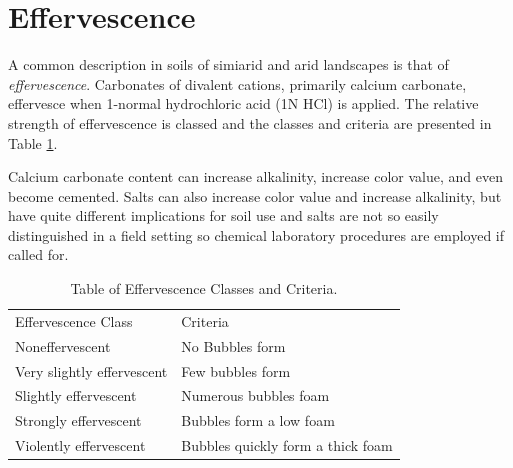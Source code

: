 \documentclass[letterpaper, 12pt]{article}
\begin{document}

 
 \section{Effervescence}
 \label{effervescence}
 

A common description in soils of simiarid and arid landscapes is that of \textit{effervescence}. Carbonates of divalent cations, primarily calcium carbonate, effervesce when 1-normal hydrochloric acid (1N HCl) is applied. The relative strength of effervescence is classed and the classes and criteria are presented in Table \ref{tab:effervescenceclasses}.

Calcium carbonate content can increase alkalinity, increase color value, and even become cemented. Salts can also increase color value and increase alkalinity, but have quite different implications for soil use and salts are not so easily distinguished in a field setting so chemical laboratory procedures are employed if called for.

\begin{table}[!htbp]
\centering
\caption{Table of Effervescence Classes and Criteria.}
\label{tab:effervescenceclasses}
\begin{tabular}{ll}
\hline
Effervescence Class         & Criteria                          \\ \hhline{==}
Noneffervescent             & No Bubbles form                   \\
Very slightly effervescent  & Few bubbles form                  \\
Slightly effervescent       & Numerous bubbles foam             \\
Strongly effervescent       & Bubbles form a low foam           \\
Violently effervescent      & Bubbles quickly form a thick foam \\
\hline
\end{tabular}
\end{table}
\end{document}
